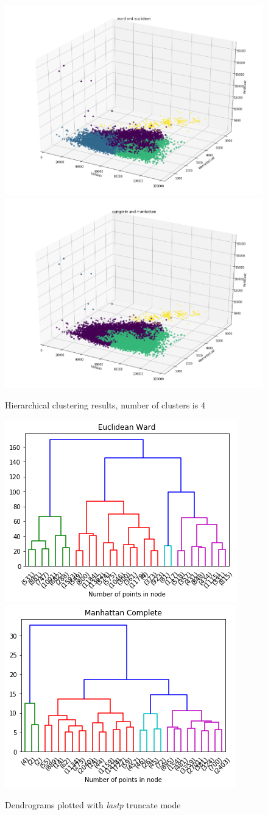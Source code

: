 \documentclass{article}
\begin{document}
	\begin{figure}[H]
		\centering
		\includegraphics[width=.44\textwidth]{wardeucl}\hspace{1cm}
		\includegraphics[width=.44\textwidth]{complman}
		\caption{Hierarchical clustering results, number of clusters is 4}
		\label{fig:hier}
	\end{figure}
	\begin{figure}[H]
		\centering
		\includegraphics[width=.44\textwidth]{dendeuc}\hspace{1cm}
		\includegraphics[width=.44\textwidth]{dendman}
		\caption{Dendrograms plotted with \emph{lastp} truncate mode}
		\label{fig:dend}
	\end{figure}
	
\end{document}
